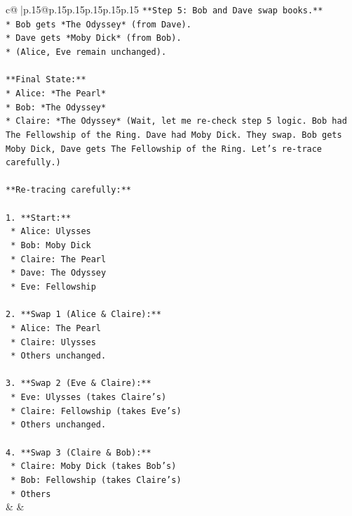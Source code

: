 \documentclass{article}
\begin{document}
{\begin{supertabular}{c@{$\;$}|p{.15\linewidth}@{}p{.15\linewidth}p{.15\linewidth}p{.15\linewidth}p{.15\linewidth}p{.15\linewidth}}
{{{\texttt{**Step 5: Bob and Dave swap books.**} \\
\texttt{*   Bob gets *The Odyssey* (from Dave).} \\
\texttt{*   Dave gets *Moby Dick* (from Bob).} \\
\texttt{*   (Alice, Eve remain unchanged).} \\
\\ 
\texttt{**Final State:**} \\
\texttt{*   Alice: *The Pearl*} \\
\texttt{*   Bob: *The Odyssey*} \\
\texttt{*   Claire: *The Odyssey* (Wait, let me re{-}check step 5 logic. Bob had The Fellowship of the Ring. Dave had Moby Dick. They swap. Bob gets Moby Dick, Dave gets The Fellowship of the Ring. Let's re{-}trace carefully.)} \\
\\ 
\texttt{**Re{-}tracing carefully:**} \\
\\ 
\texttt{1.  **Start:**} \\
\texttt{    *   Alice: Ulysses} \\
\texttt{    *   Bob: Moby Dick} \\
\texttt{    *   Claire: The Pearl} \\
\texttt{    *   Dave: The Odyssey} \\
\texttt{    *   Eve: Fellowship} \\
\\ 
\texttt{2.  **Swap 1 (Alice \& Claire):**} \\
\texttt{    *   Alice: The Pearl} \\
\texttt{    *   Claire: Ulysses} \\
\texttt{    *   Others unchanged.} \\
\\ 
\texttt{3.  **Swap 2 (Eve \& Claire):**} \\
\texttt{    *   Eve: Ulysses (takes Claire's)} \\
\texttt{    *   Claire: Fellowship (takes Eve's)} \\
\texttt{    *   Others unchanged.} \\
\\ 
\texttt{4.  **Swap 3 (Claire \& Bob):**} \\
\texttt{    *   Claire: Moby Dick (takes Bob's)} \\
\texttt{    *   Bob: Fellowship (takes Claire's)} \\
\texttt{    *   Others} \\
            }
        }
    }
    & & \\ \\


\end{supertabular}}
\end{document}
